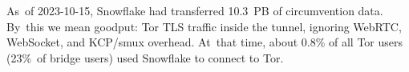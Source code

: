 \documentclass[letterpaper,twocolumn]{article}
\begin{document}
As~of \mbox{2023-10-15},
Snowflake had transferred 10.3~PB of circumvention data.
By~this we mean goodput: Tor TLS traffic inside the tunnel,
ignoring WebRTC, WebSocket, and KCP/\allowbreak smux overhead.
At~that time, about 0.8\% of all Tor users
(23\%~of bridge users) used Snowflake to connect to Tor.
\end{document}
